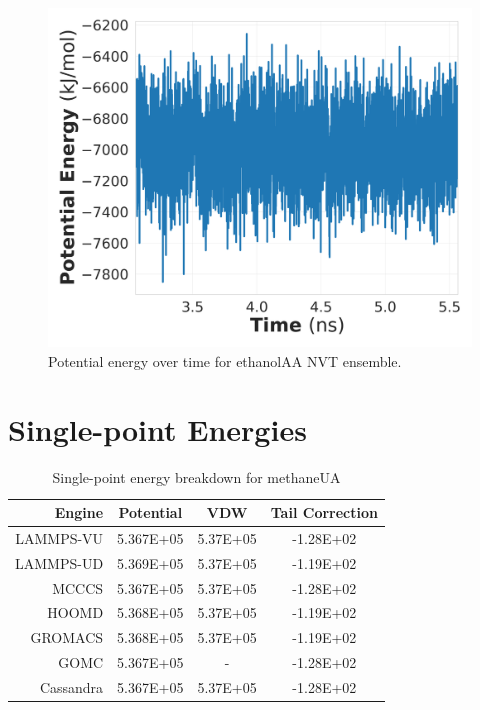 \begin{figure}[h!]
    \centering
    \includegraphics[width=0.8\linewidth,keepaspectratio]{figures/rep_study/ethanol_pe.png}
    \caption{Potential energy over time for ethanolAA NVT ensemble.}\label{fig:ethanol_pe_evolution}
\end{figure}

\section{Single-point Energies}

\begin{table}
\caption{Single-point energy breakdown for methaneUA}\label{tab:sp_methane}
\centering
\begin{tabular}{rccc}
Engine & Potential & VDW & Tail Correction \\ \hline
LAMMPS-VU & 5.367E+05 & 5.37E+05 & -1.28E+02 \\
LAMMPS-UD & 5.369E+05 & 5.37E+05 & -1.19E+02 \\
MCCCS & 5.367E+05 & 5.37E+05 & -1.28E+02 \\
HOOMD & 5.368E+05 & 5.37E+05 & -1.19E+02 \\
GROMACS & 5.368E+05 & 5.37E+05 & -1.19E+02 \\
GOMC & 5.367E+05 & - & -1.28E+02 \\
Cassandra & 5.367E+05 & 5.37E+05 & -1.28E+02 \\ \hline
\end{tabular}
\end{table}

